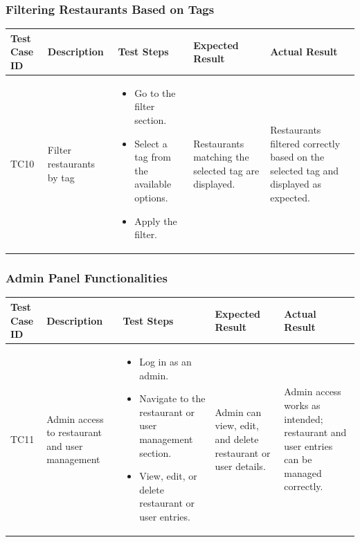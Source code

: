 \documentclass[12pt, a4paper, oneside]{article}
\begin{document}
\subsubsection{Filtering Restaurants Based on Tags}
\captionsetup{type=table}
\begin{tabularx}{\textwidth}{|X|X|X|X|X|}
	\hline
	\rowcolor{gray}
	\textbf{Test Case ID} & \textbf{Description} & \textbf{Test Steps} & \textbf{Expected Result} & \textbf{Actual Result} \\ \hline
	TC10 & Filter restaurants by tag & 
    \begin{itemize}[left=0pt, nosep]
        \item Go to the filter section.
        \item Select a tag from the available options.
        \item Apply the filter.
    \end{itemize}
    & Restaurants matching the selected tag are displayed. & Restaurants filtered correctly based on the selected tag and displayed as expected. \\ \hline
\end{tabularx}
\label{tab:filter-tags}

\subsubsection{Admin Panel Functionalities}
\captionsetup{type=table}
\begin{tabularx}{\textwidth}{|X|X|X|X|X|}
	\hline
	\rowcolor{gray}
	\textbf{Test Case ID} & \textbf{Description} & \textbf{Test Steps} & \textbf{Expected Result} & \textbf{Actual Result} \\ \hline
	TC11 & Admin access to restaurant and user management & 
    \begin{itemize}[left=0pt, nosep]
        \item Log in as an admin.
        \item Navigate to the restaurant or user management section.
        \item View, edit, or delete restaurant or user entries.
    \end{itemize}
    & Admin can view, edit, and delete restaurant or user details. & Admin access works as intended; restaurant and user entries can be managed correctly. \\ \hline
\end{tabularx}
\label{tab:admin-panel}
\end{document}
